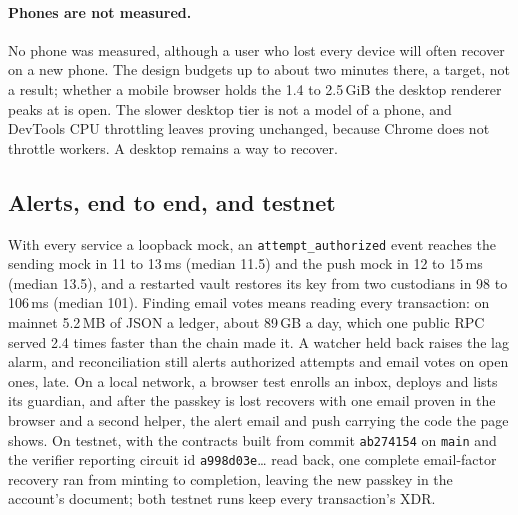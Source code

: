 \paragraph{Phones are not measured.} No phone was measured, although a
user who lost every device will often recover on a new phone. The design
budgets up to about two minutes there, a target, not a
result; whether a mobile browser holds the 1.4
to 2.5\,GiB the desktop renderer peaks at is open. The slower desktop tier is
not a model of a phone, and DevTools CPU throttling leaves proving unchanged,
because Chrome does not throttle workers. A
desktop remains a way to recover.

\subsection{Alerts, end to end, and testnet}\label{sec:eval-e2e}
With every service a loopback mock, an \texttt{attempt\_authorized} event
reaches the sending mock in 11 to 13\,ms (median 11.5) and the push mock in
12 to 15\,ms (median 13.5), and a restarted vault restores its key from two
custodians in 98 to 106\,ms (median 101). Finding
email votes means reading every transaction: on mainnet 5.2\,MB of JSON a
ledger, about 89\,GB a day, which one public RPC served 2.4 times faster
than the chain made it. A watcher held back raises the
lag alarm, and reconciliation still alerts authorized attempts and email
votes on open ones, late. On a local
network, a browser test enrolls an inbox, deploys and lists its
guardian, and after the passkey is lost recovers with one email proven in
the browser and a second helper, the alert email and push carrying the code
the page shows. On testnet, with the contracts
built from commit \texttt{ab274154} on \texttt{main} and the verifier
reporting circuit id \texttt{a998d03e}\ldots{} read back, one complete
email-factor recovery ran from minting to completion, leaving the new
passkey in the account's document; both testnet runs keep every
transaction's XDR.
